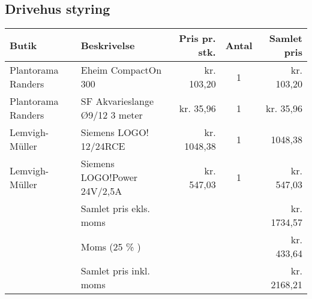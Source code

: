 \subsection{Drivehus styring}
\begin{tabular}[c]{|l|l|r|c|r|}
    \hline
    Butik & Beskrivelse & Pris pr. stk. & Antal & Samlet pris \\
    \hline \hline
    Plantorama Randers & Eheim CompactOn 300 &  kr. 103,20 & 1 & kr. 103,20 \\
    \hline
    Plantorama Randers & SF Akvarieslange Ø9/12 3 meter & kr. 35,96 & 1 & kr. 35,96 \\
    \hline
    Lemvigh-Müller & Siemens LOGO! 12/24RCE & kr. 1048,38 & 1 & 1048,38 \\
    \hline
    Lemvigh-Müller & Siemens LOGO!Power 24V/2,5A &  kr. 547,03 & 1 & kr. 547,03 \\
    \hline
                    & Samlet pris ekls. moms &  & & kr. 1734,57 \\
                    & Moms (25 \% ) & & & kr. 433,64 \\
                    & Samlet pris inkl. moms & & & kr. 2168,21 \\
                    \hline

\end{tabular}